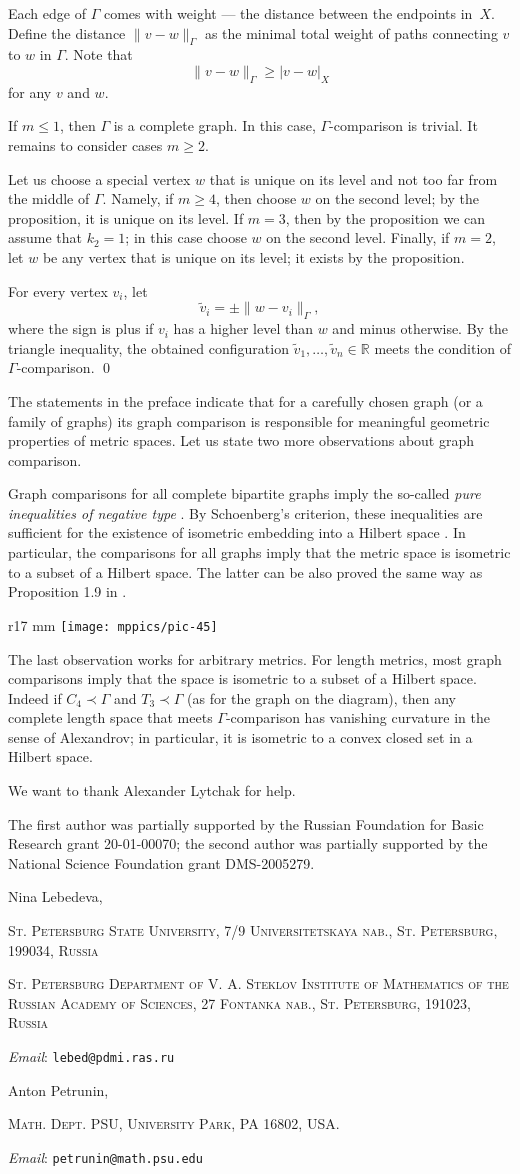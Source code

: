 \documentclass{article}
\makeatletter
\newcommand{\Addresses}{{\bigskip\footnotesize

\noindent Nina Lebedeva,
\par\nopagebreak
 \textsc{St. Petersburg State University, 7/9 Universitetskaya nab., St. Petersburg, 199034, Russia}
\par
\nopagebreak
 \textsc{St. Petersburg Department of V. A. Steklov Institute of Mathematics of the Russian Academy of Sciences, 27 Fontanka nab., St. Petersburg, 191023, Russia}
  \par\nopagebreak
  \textit{Email}: \texttt{lebed@pdmi.ras.ru}

\medskip

\noindent   Anton Petrunin, 
\par\nopagebreak
 \textsc{Math. Dept. PSU, University Park, PA 16802, USA.}
  \par\nopagebreak
  \textit{Email}: \texttt{petrunin@math.psu.edu}
  
}}
\def\parbf#1{\medskip\noindent{\bf #1}}
\def\qeds{\qed\par\medskip}
\makeatother
\begin{document}
Each edge of $\Gamma$ comes with weight --- the distance between the endpoints in~$X$.
Define the distance $\|v-w\|_\Gamma$ as the minimal total weight of paths connecting $v$ to $w$ in $\Gamma$.
Note that 
\[\|v-w\|_\Gamma\geqslant |v-w|_X\]
for any $v$ and $w$.

If $m\leqslant 1$, then $\Gamma$ is a complete graph.
In this case, $\Gamma$-comparison is trivial.
It remains to consider cases $m\geqslant2$.

Let us choose a special vertex $w$ that is unique on its level and not too far from the middle of $\Gamma$.
Namely, if $m\geqslant 4$, then choose $w$ on the second level;
by the proposition, it is unique on its level.
If $m=3$, then by the proposition we can assume that $k_2=1$; in this case choose $w$ on the second level.
Finally, if $m=2$, let $w$ be any vertex that is unique on its level; it exists by the proposition. 

For every vertex $v_i$, let
\[\tilde v_i=\pm \|w-v_i\|_\Gamma,\]
where the sign is plus if $v_i$ has a higher level than $w$ and minus otherwise.
By the triangle inequality, the obtained configuration $\tilde v_1,\dots,\tilde v_n\in\mathbb{R}$ meets the condition of $\Gamma$-comparison.
\qeds

\parbf{Remarks.}
The statements in the preface indicate that for a carefully chosen graph (or a family of graphs) its graph comparison is responsible for meaningful geometric properties of metric spaces.
Let us state two more observations about graph comparison.

Graph comparisons for all complete bipartite graphs imply the so-called \emph{pure inequalities of negative type} \cite[6.1.1]{deza-laurent}.
By Schoenberg's criterion, these inequalities are sufficient for the existence of isometric embedding into a Hilbert space \cite[6.2.1]{deza-laurent}.
In particular, the comparisons for all graphs imply that the metric space is isometric to a subset of a Hilbert space.
The latter can be also proved the same way as Proposition 1.9 in \cite{toyoda}.

\begin{wrapfigure}{r}{17 mm}
\vskip-6mm
\centering
\texttt{[image: mppics/pic-45]}
\vskip-2mm
\end{wrapfigure}

The last observation works for arbitrary metrics.
For length metrics, most graph comparisons imply that the space is isometric to a subset of a Hilbert space.
Indeed if $C_4\prec\Gamma$ and $T_3\prec\Gamma$ (as for the graph on the diagram), then any complete length space that meets $\Gamma$-comparison has vanishing curvature in the sense of Alexandrov; in particular, it is isometric to a convex closed set in a Hilbert space.





\parbf{Acknowledgments.}
We want to thank Alexander Lytchak for help. 

The first author was partially supported by the Russian Foundation for Basic Research grant 20-01-00070; the second author was partially supported by the National Science Foundation grant DMS-2005279.

{\sloppy
\printbibliography[heading=bibintoc]
\fussy
}

\Addresses
\end{document}
